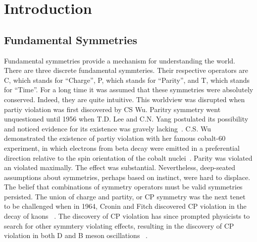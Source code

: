 \chapter{Introduction}
\section{Fundamental Symmetries}

Fundamental symmetries provide a mechanism for understanding the world. There are three discrete fundamental symmteries. Their respective operators are C, which stands for ``Charge'', P, which stands for ``Parity'', and T, which stands for ``Time''. For a long time it was assumed that these symmetries were absolutely conserved. Indeed, they are quite intuitive. This worldview was disrupted when partiy violation was first discovered by CS Wu. Paritry symmetry went unquestioned until 1956 when T.D. Lee and C.N. Yang postulated its possibility and noticed evidence for its existence was gravely lacking~\cite{PhysRev.104.254}. C.S. Wu demonstrated the existence of partiy violation with her famous cobalt-60 experiment, in which electrons from beta decay were emitted in a preferential direction relative to the spin orientation of the cobalt nuclei~\cite{PhysRev.105.1413}. Parity was violated an violated maximally. The effect was substantial. Nevertheless, deep-seated assumptions about symmetries, perhaps based on instinct, were hard to displace. The belief that combinations of symmetry operators must be valid symmetries persisted. The union of charge and partity, or CP symmetry was the next tenet to be challenged when in 1964, Cronin and Fitch discovered CP violation in the decay of kaons ~\cite{PhysRevLett.13.138}. The discovery of CP violation has since prompted physicists to search for other symmtery violating effects, resulting in the discovery of CP violation in both D and B meson oscillations ~\cite{PhysRevLett.87.091801}.
